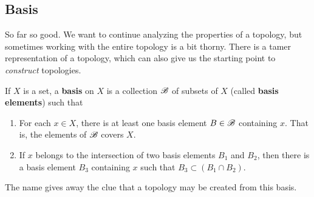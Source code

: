 \subsection{Basis} 

  So far so good. We want to continue analyzing the properties of a topology, but sometimes working with the entire topology is a bit thorny. There is a tamer representation of a topology, which can also give us the starting point to \textit{construct} topologies. 

  \begin{definition}[Basis]
    If $X$ is a set, a \textbf{basis} on $X$ is a collection $\operatorname{\mathscr{B}}$ of subsets of $X$ (called \textbf{basis elements}) such that
    \begin{enumerate}
      \item For each $x \in X$, there is at least one basis element $B \in \operatorname{\mathscr{B}}$ containing $x$. That is, the elements of $\operatorname{\mathscr{B}}$ covers $X$. 
      \item If $x$ belongs to the intersection of two basis elements $B_1$ and $B_2$, then there is a basis element $B_3$ containing $x$ such that $B_3 \subset (B_1 \cap B_2)$. 
    \end{enumerate}
  \end{definition} 

  The name gives away the clue that a topology may be created from this basis.  

